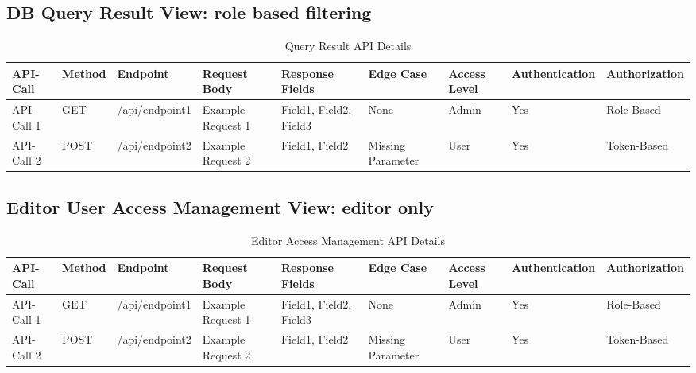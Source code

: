 \documentclass[manuscript]{acmart}
\begin{document}
\subsection{DB Query Result View: role based filtering}
\begin{table*}[h!]
  \scriptsize %
  \setlength{\tabcolsep}{4pt} %
  \caption{Query Result API Details}
  \label{tab:api-details}
  \begin{tabular}{llm{}
                  m{}
                  m{}
                  m{}
                  m{}
                  m{}}
    \toprule
    API-Call & Method & Endpoint & Request Body & Response Fields & Edge Case & Access Level & Authentication & Authorization \\
    \midrule
    API-Call 1 & GET & /api/endpoint1 & Example Request 1 & Field1, Field2, Field3 & None & Admin & Yes & Role-Based \\
    API-Call 2 & POST & /api/endpoint2 & Example Request 2 & Field1, Field2 & Missing Parameter & User & Yes & Token-Based \\
    \bottomrule
  \end{tabular}
\end{table*}


\subsection{Editor User Access Management View: editor only}
\begin{table*}[h!]
  \scriptsize %
  \setlength{\tabcolsep}{4pt} %
  \caption{Editor Access Management API Details}
  \label{tab:api-details}
  \begin{tabular}{llm{}
                  m{}
                  m{}
                  m{}
                  m{}
                  m{}}
    \toprule
    API-Call & Method & Endpoint & Request Body & Response Fields & Edge Case & Access Level & Authentication & Authorization \\
    \midrule
    API-Call 1 & GET & /api/endpoint1 & Example Request 1 & Field1, Field2, Field3 & None & Admin & Yes & Role-Based \\
    API-Call 2 & POST & /api/endpoint2 & Example Request 2 & Field1, Field2 & Missing Parameter & User & Yes & Token-Based \\
    \bottomrule
  \end{tabular}
\end{table*}
\end{document}
